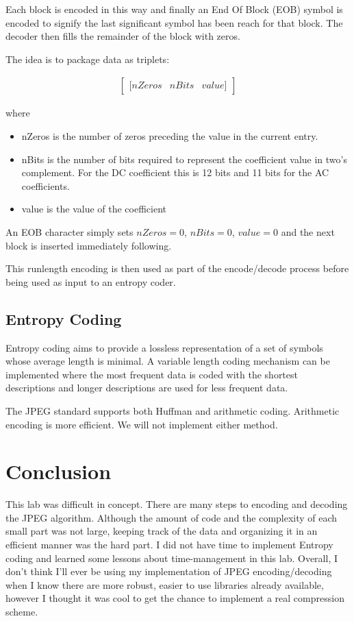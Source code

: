 \documentclass[11pt,a4paper]{article}
\begin{document}
Each block is encoded in this way and finally an End Of Block (EOB) symbol is encoded to signify the last significant symbol has been reach for that block. The decoder then fills the remainder of the block with zeros.

The idea is to package data as triplets:

\begin{align*}
\begin{bmatrix}
[nZeros & nBits & value]
\end{bmatrix}
\end{align*}

where 

\begin{itemize}
\item nZeros is the number of zeros preceding the value in the current entry.
\item nBits is the number of bits required to represent the coefficient value in two's complement. For the DC coefficient this is 12 bits and 11 bits for the AC coefficients.
\item value is the value of the coefficient
\end{itemize}

An EOB character simply sets $nZeros = 0$, $nBits = 0$, $value = 0$ and the next block is inserted immediately following.

This runlength encoding is then used as part of the encode/decode process before being used as input to an entropy coder.

\subsection{Entropy Coding}
Entropy coding aims to provide a lossless representation of a set of symbols whose average length is minimal. A variable length coding mechanism can be implemented where the most frequent data is coded with the shortest descriptions and longer descriptions are used for less frequent data. 

The JPEG standard supports both Huffman and arithmetic coding. Arithmetic encoding is more efficient. We will not implement either method.

\section{Conclusion}
This lab was difficult in concept. There are many steps to encoding and decoding the JPEG algorithm. Although the amount of code and the complexity of each small part was not large, keeping track of the data and organizing it in an efficient manner was the hard part. I did not have time to implement Entropy coding and learned some lessons about time-management in this lab. Overall, I don't think I'll ever be using my implementation of JPEG encoding/decoding when I know there are more robust, easier to use libraries already available, however I thought it was cool to get the chance to implement a real compression scheme.
\end{document}
